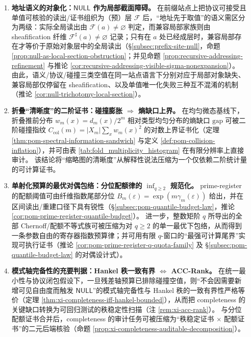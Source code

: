 \begin{enumerate}
  \item \textbf{地址语义的对象化：\(\mathsf{NULL}\) 作为局部截面障碍。}
  在前缀站点上把协议可接受且单值可核验的读出/证书组织为（预）层 \(\mathscr F\) 后，“地址先于取值”的语义需区分为两级：实际全局读出由 \(\mathscr F(a)\neq\varnothing\) 判定，而兼容局部家族则由 sheafification 纤维 \(\mathscr F^\sharp(a)\neq\varnothing\) 记录；只有在 \(a\) 处已经成层时，兼容局部存在才等价于原始对象层中的全局读出（\S\ref{subsec:prefix-site-null}，命题 \ref{prop:null-as-local-section-obstruction}；并见命题 \ref{prop:recursive-addressing-refinement} 与推论 \ref{cor:recursive-addressing-visible-sigma-nonexpansion}）。
  由此，语义/协议/碰撞三类空值在同一站点语言下分别对应于局部对象缺失、兼容局部仅停留在 sheafification、以及单值唯一化失败三种互不混淆的机制（推论 \ref{cor:null-trichotomy-local-section}）。

  \item \textbf{折叠“清晰度”的二阶证书：碰撞膨胀 \(\Rightarrow\) 熵缺口上界。}
  在均匀微态基线下，折叠推前分布 \(w_m(x)=d_m(x)/2^m\) 相对类型均匀分布的熵缺口 \(\mathrm{gap}\) 可被二阶碰撞指纹
  \(C_{\mathrm{col}}(m)=|X_m|\sum_x w_m(x)^2\)
  的对数上界证书化（定理 \ref{thm:pom-spectral-information-sandwich} 与定义 \ref{def:pom-collision-inflation}），并可由表 \ref{tab:fold_multiplicity_histogram} 在有限分辨率上直接审计。
  该结论将“缩略图的清晰度”从解释性说法压缩为一个仅依赖二阶统计量的可计算证书。

  \item \textbf{单射化预算的最优对偶包络：分位配额律的 \(\inf_{q\ge 2}\) 规范化。}
  prime-register 的配额阈值可由纤维指数尾部分位 \(B_m(\varepsilon)=\exp(m\gamma_m(\varepsilon))\) 给出，并在区间读出/重建口径下具有锐性（\S\ref{subsec:pom-quantile-budget-law}，推论 \ref{cor:pom-prime-register-quantile-budget}）。
  进一步，整数矩阶 \(q\) 所导出的全部 Chernoff/配额不等式族可被压缩为对 \(q\ge 2\) 的单一最优下包络，从而得到一条参数自由的寄存器指数预算律；并可用有限 \(q\)-窗口的“最强可计算尾界”实现可执行证书（推论 \ref{cor:pom-prime-register-q-quota-family} 及 \S\ref{subsec:pom-quantile-budget-law} 的对偶设计式）。

  \item \textbf{模式轴完备性的充要判据：Hankel 秩一致有界 \(\Longleftrightarrow\) ACC-Rank。}
  在统一最小性与协议闭包假设下，一旦残差轴预算已排除碰撞空值，则“不会因需要新增可见自由度而触发 \(\mathsf{NULL}\)”的模式轴完备性与 Hankel 秩的一致有界性严格等价（定理 \ref{thm:xi-completeness-iff-hankel-bounded}），从而把 completeness 的关键缺口转换为可回归测试的秩稳定性扫描（注 \ref{rem:xi-acc-rank}）。
  与分位配额证书合并后，completeness 的审计任务可被压缩为“秩稳定证书 \(\times\) 配额证书”的二元后端核验（命题 \ref{prop:xi-completeness-auditable-decomposition}）。
\end{enumerate}

